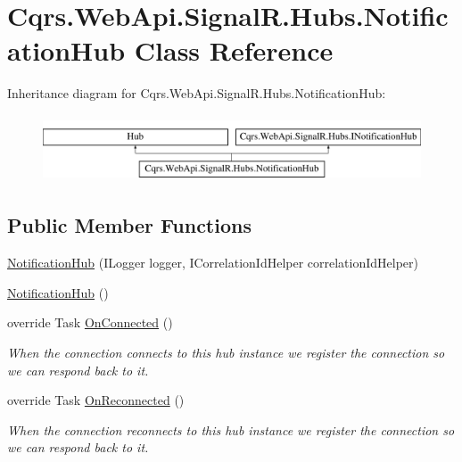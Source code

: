 \hypertarget{classCqrs_1_1WebApi_1_1SignalR_1_1Hubs_1_1NotificationHub}{}\section{Cqrs.\+Web\+Api.\+Signal\+R.\+Hubs.\+Notification\+Hub Class Reference}
\label{classCqrs_1_1WebApi_1_1SignalR_1_1Hubs_1_1NotificationHub}
Inheritance diagram for Cqrs.\+Web\+Api.\+Signal\+R.\+Hubs.\+Notification\+Hub\+:\begin{figure}[H]
\begin{center}
\leavevmode
\includegraphics[height=2.000000cm]{classCqrs_1_1WebApi_1_1SignalR_1_1Hubs_1_1NotificationHub}
\end{center}
\end{figure}
\subsection*{Public Member Functions}
\begin{DoxyCompactItemize}
\item 
\hyperlink{classCqrs_1_1WebApi_1_1SignalR_1_1Hubs_1_1NotificationHub_aeb3d9f4d90baeb103231c5c47a13e00d}{Notification\+Hub} (I\+Logger logger, I\+Correlation\+Id\+Helper correlation\+Id\+Helper)
\item 
\hyperlink{classCqrs_1_1WebApi_1_1SignalR_1_1Hubs_1_1NotificationHub_a83b123b045c22ce5bcaee79168cca10a}{Notification\+Hub} ()
\item 
override Task \hyperlink{classCqrs_1_1WebApi_1_1SignalR_1_1Hubs_1_1NotificationHub_a0188fd4fea68476ffc3b375482c7b56c}{On\+Connected} ()
\begin{DoxyCompactList}\small\item\em When the connection connects to this hub instance we register the connection so we can respond back to it. \end{DoxyCompactList}\item 
override Task \hyperlink{classCqrs_1_1WebApi_1_1SignalR_1_1Hubs_1_1NotificationHub_acaadcc7cc9f00c184e12b6bb725a2167}{On\+Reconnected} ()
\begin{DoxyCompactList}\small\item\em When the connection reconnects to this hub instance we register the connection so we can respond back to it. \end{DoxyCompactList}\end{DoxyCompactItemize}
